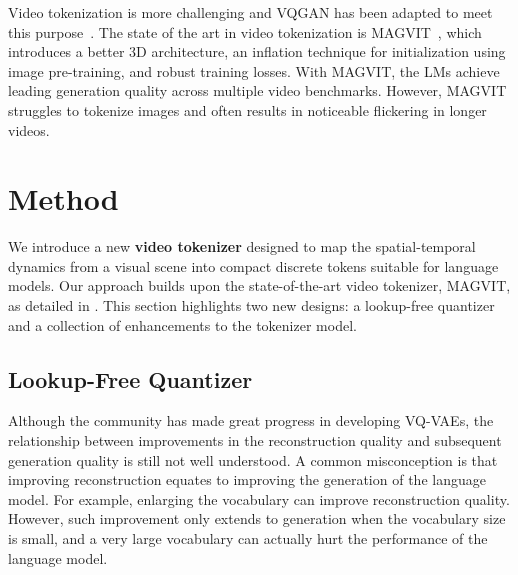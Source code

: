 Video tokenization is more challenging and VQGAN has been adapted to meet this purpose~\citep{ge2022long,villegas2022phenaki,yu2022magvit}. The state of the art in video tokenization is MAGVIT~\citep{yu2022magvit}, which introduces a better 3D architecture, an inflation technique for initialization using image pre-training, and robust training losses. With MAGVIT, the LMs achieve leading generation quality across multiple video benchmarks. However, MAGVIT struggles to tokenize images and often results in noticeable flickering in longer videos.

\vspace{-4mm}
\section{Method}
\vspace{-2mm}

We introduce a new \textbf{video tokenizer} designed to map the spatial-temporal dynamics from a visual scene into compact discrete tokens suitable for language models. 
Our approach builds upon the state-of-the-art video tokenizer, MAGVIT, as detailed in \citet{yu2022magvit}. 
This section highlights two new designs: a lookup-free quantizer and a collection of enhancements to the tokenizer model.
\vspace{-2mm}
\subsection{Lookup-Free Quantizer}
\vspace{-2mm}

Although the community has made great progress in developing VQ-VAEs, the relationship between improvements in the reconstruction quality and subsequent generation quality is still not well understood.
A common misconception is that improving reconstruction equates to improving the generation of the language model.
For example, enlarging the vocabulary can improve reconstruction quality. However, such improvement only extends to generation when the vocabulary size is small, and a very large vocabulary can actually hurt the performance of the language model. 

